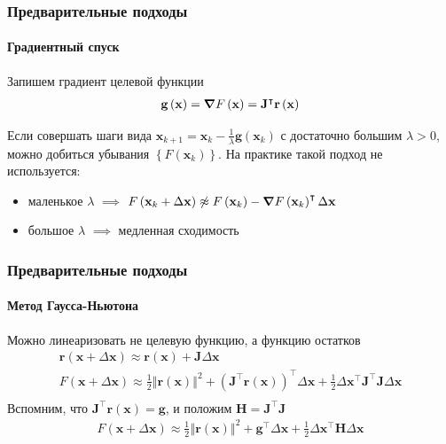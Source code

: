 \documentclass[notheorems,aspectratio=169]{beamer}
\begin{document}
\begin{frame}
  \frametitle{Предварительные подходы}
  \framesubtitle{Градиентный спуск}
  Запишем градиент целевой функции
  \begin{equation*}
    \begin{gathered}
      \mathbf{g}\left(\mathbf{x}\right)=\grad F\left(\mathbf{x}\right)=\mathbf{J}^\intercal \mathbf{r}\left(\mathbf{x}\right) \\
    \end{gathered}
  \end{equation*}
  
  Если совершать шаги вида $\mathbf{x}_{k+1}=\mathbf{x}_k-\frac{1}{\lambda}\mathbf{g}\left(\mathbf{x}_k\right)$ с достаточно большим $\lambda>0$, можно добиться убывания $\left\{F\left(\mathbf{x}_k\right)\right\}$. На практике такой подход не используется:
  \begin{itemize}
    \item маленькое $\lambda$ $\implies$ $F\left(\mathbf{x}_{k}+\Delta\mathbf{x}\right)\not\approx F\left(\mathbf{x}_k\right)-\grad F\left(\mathbf{x}_k\right)^\intercal\Delta\mathbf{x}$
    \item большое $\lambda$ $\implies$ медленная сходимость
  \end{itemize}
\end{frame}

\begin{frame}
  \frametitle{Предварительные подходы}
  \framesubtitle{Метод Гаусса-Ньютона}
  Можно линеаризовать не целевую функцию, а функцию остатков
  \begin{equation*}
    \begin{gathered}
      \mathbf{r}\left(\mathbf{x}+\Delta\mathbf{x}\right)\approx\mathbf{r}\left(\mathbf{x}\right)+\mathbf{J}\Delta\mathbf{x} \\
      F\left(\mathbf{x}+\Delta\mathbf{x}\right)\approx\frac{1}{2}\left\Vert\mathbf{r}\left(\mathbf{x}\right)\right\Vert^2+\left(\mathbf{J}^\intercal\mathbf{r}\left(\mathbf{x}\right)\right)^\intercal\Delta\mathbf{x}+\frac{1}{2}\Delta\mathbf{x}^\intercal\mathbf{J}^\intercal\mathbf{J}\Delta\mathbf{x}\\
    \end{gathered}
  \end{equation*}
  Вспомним, что $\mathbf{J}^\intercal\mathbf{r}\left(\mathbf{x}\right)=\mathbf{g}$, и положим $\mathbf{H}=\mathbf{J}^\intercal\mathbf{J}$
  \begin{equation*}
    \begin{gathered}
      F\left(\mathbf{x}+\Delta\mathbf{x}\right)\approx\frac{1}{2}\left\Vert\mathbf{r}\left(\mathbf{x}\right)\right\Vert^2+\mathbf{g}^\intercal\Delta\mathbf{x}+\frac{1}{2}\Delta\mathbf{x}^\intercal\mathbf{H}\Delta\mathbf{x}\\
    \end{gathered}
  \end{equation*}
\end{frame}
\end{document}
